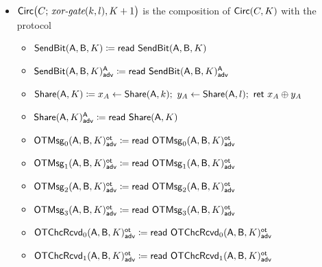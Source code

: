 \begin{itemize}
\item $\Circ\big(C; \, \xorgate(k,l),K+1\big)$ is the composition of $\Circ(C,K)$ with the protocol
\begin{itemize}
\item $\SendBit(\A,\B,K) \coloneqq \read{\SendBit(\A,\B,K)}$
\item {\color{blue} $\LeakSendBit(\A,\B,K)^\A_\adv \coloneqq \read{\LeakSendBit(\A,\B,K)^\A_\adv}$}\smallskip
\item $\Share(\A,K) \coloneqq x_A \leftarrow \Share(\A,k); \ y_A \leftarrow \Share(\A,l); \ \ret{x_A \oplus y_A}$
\item {\color{blue} $\LeakShare(\A,K)^\A_\adv \coloneqq \read{\Share(\A,K)}$}\smallskip
\item {\color{blue} $\LeakOTMsg_0(\A,\B,K)^\ot_\adv \coloneqq \read{\LeakOTMsg_0(\A,\B,K)^\ot_\adv}$}
\item {\color{blue} $\LeakOTMsg_1(\A,\B,K)^\ot_\adv \coloneqq \read{\LeakOTMsg_1(\A,\B,K)^\ot_\adv}$}
\item {\color{blue} $\LeakOTMsg_2(\A,\B,K)^\ot_\adv \coloneqq \read{\LeakOTMsg_2(\A,\B,K)^\ot_\adv}$}
\item {\color{blue} $\LeakOTMsg_3(\A,\B,K)^\ot_\adv \coloneqq \read{\LeakOTMsg_3(\A,\B,K)^\ot_\adv}$}\smallskip
\item {\color{blue} $\LeakOTChcRcvd_0(\A,\B,K)^\ot_\adv \coloneqq \read{\LeakOTChcRcvd_0(\A,\B,K)^\ot_\adv}$}
\item {\color{blue} $\LeakOTChcRcvd_1(\A,\B,K)^\ot_\adv \coloneqq \read{\LeakOTChcRcvd_1(\A,\B,K)^\ot_\adv}$}
\end{itemize}


\end{itemize}
